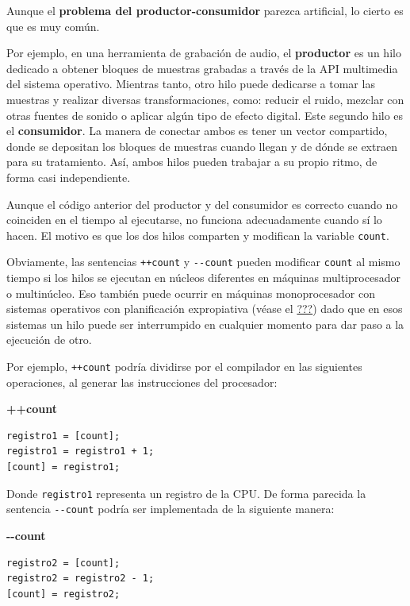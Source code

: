 Aunque el \textbf{problema del productor-consumidor} parezca artificial,
lo cierto es que es muy común.

Por ejemplo, en una herramienta de grabación de audio, el
\textbf{productor} es un hilo dedicado a obtener bloques de muestras
grabadas a través de la API multimedia del sistema operativo. Mientras
tanto, otro hilo puede dedicarse a tomar las muestras y realizar
diversas transformaciones, como: reducir el ruido, mezclar con otras
fuentes de sonido o aplicar algún tipo de efecto digital. Este segundo
hilo es el \textbf{consumidor}. La manera de conectar ambos es tener un
vector compartido, donde se depositan los bloques de muestras cuando
llegan y de dónde se extraen para su tratamiento. Así, ambos hilos
pueden trabajar a su propio ritmo, de forma casi independiente.

Aunque el código anterior del productor y del consumidor es correcto
cuando no coinciden en el tiempo al ejecutarse, no funciona
adecuadamente cuando sí lo hacen. El motivo es que los dos hilos
comparten y modifican la variable \texttt{count}.

Obviamente, las sentencias \texttt{++count} y \texttt{-\/-count} pueden
modificar \texttt{count} al mismo tiempo si los hilos se ejecutan en
núcleos diferentes en máquinas multiprocesador o multinúcleo. Eso
también puede ocurrir en máquinas monoprocesador con sistemas operativos
con planificación expropiativa (véase el
\hyperref[_planificaciuxf3n_expropiativa]{???}) dado que en esos
sistemas un hilo puede ser interrumpido en cualquier momento para dar
paso a la ejecución de otro.

Por ejemplo, \texttt{++count} podría dividirse por el compilador en las
siguientes operaciones, al generar las instrucciones del procesador:

\textbf{++count}

\begin{verbatim}
registro1 = [count];
registro1 = registro1 + 1;
[count] = registro1;
\end{verbatim}

Donde \texttt{registro1} representa un registro de la CPU. De forma
parecida la sentencia \texttt{-\/-count} podría ser implementada de la
siguiente manera:

\textbf{-\/-count}

\begin{verbatim}
registro2 = [count];
registro2 = registro2 - 1;
[count] = registro2;
\end{verbatim}

